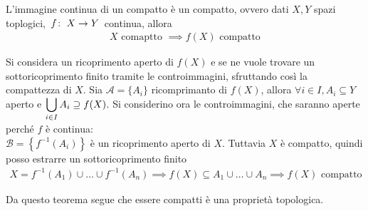 \begin{theorema}\label{immagine compatto}
	L'immagine continua di un compatto è un compatto, ovvero dati $X,Y$ spazi toplogici, $\funz f X Y$ continua, allora
		\begin{gather*}
			X \text{ comaptto } \implies f(X) \text{ compatto}
		\end{gather*}
\end{theorema}
\begin{demonstration}
	Si considera un ricoprimento aperto di $f(X)$ e se ne vuole trovare un sottoricoprimento finito tramite le controimmagini, sfruttando così la compattezza di $X$. \newline
	Sia  $\mathcal{A}=\{A_i\}$ ricomprimanto di $f(X)$, allora $\forall i\in I, A_i\subseteq Y$ aperto e $\displaystyle \mathop{{\bigcup}}\displaylimits_{i\in I}A_i \supseteq f(X)$. \newline
	Si considerino ora le controimmagini, che saranno aperte perché $f$ è continua:\\ $\mathcal{B}=\left\{f^{-1}(A_i)\right\}$ è un ricoprimento aperto di $X$. Tuttavia $X$ è compatto, quindi posso estrarre un sottoricoprimento finito 
		\begin{gather*}
			X=f^{-1}(A_1) \cup	\dots \cup f^{-1}(A_n) \implies f(X)\subseteq A_1\cup \dots \cup A_n \implies f(X) \text{ compatto}
		\end{gather*}
\end{demonstration}
Da questo teorema segue che essere compatti è una proprietà topologica.



